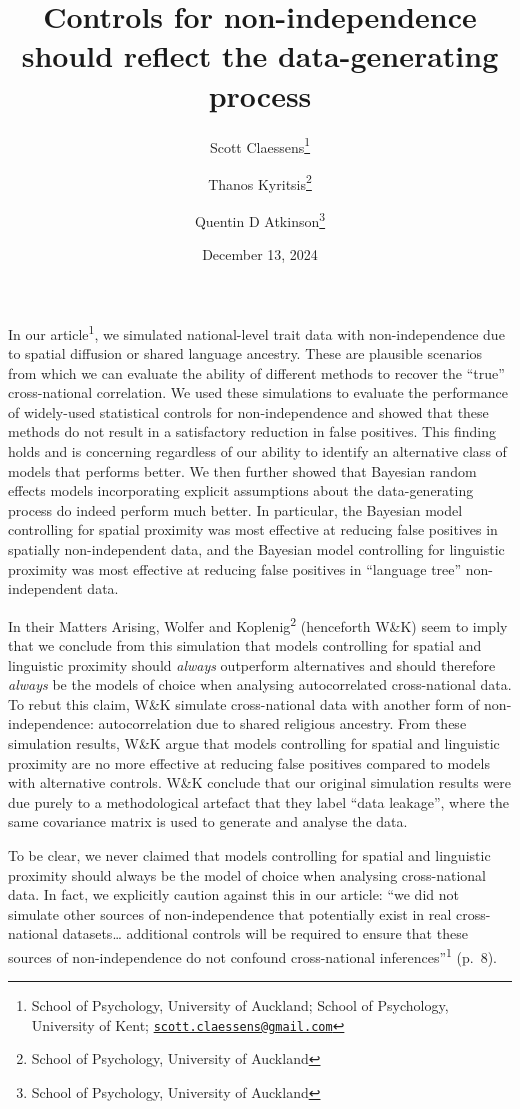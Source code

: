 \documentclass[
  11pt,
]{article}
\title{Controls for non-independence should reflect the data-generating process}
\author{Scott Claessens\footnote{School of Psychology, University of Auckland; School of Psychology, University of Kent; \href{mailto:scott.claessens@gmail.com}{\nolinkurl{scott.claessens@gmail.com}}} \and Thanos Kyritsis\footnote{School of Psychology, University of Auckland} \and Quentin D Atkinson\footnote{School of Psychology, University of Auckland}}
\date{December 13, 2024}
\begin{document}
\maketitle

\linenumbers

In our article\textsuperscript{1}, we simulated national-level trait data with
non-independence due to spatial diffusion or shared language ancestry. These are
plausible scenarios from which we can evaluate the ability of different methods
to recover the ``true'' cross-national correlation. We used these simulations to
evaluate the performance of widely-used statistical controls for
non-independence and showed that these methods do not result in a satisfactory
reduction in false positives. This finding holds and is concerning regardless of
our ability to identify an alternative class of models that performs better. We
then further showed that Bayesian random effects models incorporating explicit
assumptions about the data-generating process do indeed perform much better. In
particular, the Bayesian model controlling for spatial proximity was most
effective at reducing false positives in spatially non-independent data, and the
Bayesian model controlling for linguistic proximity was most effective at
reducing false positives in ``language tree'' non-independent data.

In their Matters Arising, Wolfer and Koplenig\textsuperscript{2} (henceforth W\&K) seem
to imply that we conclude from this simulation that models controlling for
spatial and linguistic proximity should \emph{always} outperform alternatives and
should therefore \emph{always} be the models of choice when analysing autocorrelated
cross-national data. To rebut this claim, W\&K simulate cross-national data with
another form of non-independence: autocorrelation due to shared religious
ancestry. From these simulation results, W\&K argue that models controlling for
spatial and linguistic proximity are no more effective at reducing false
positives compared to models with alternative controls. W\&K conclude that our
original simulation results were due purely to a methodological artefact that
they label ``data leakage'', where the same covariance matrix is used to generate
and analyse the data.

To be clear, we never claimed that models controlling for spatial and linguistic
proximity should always be the model of choice when analysing cross-national
data. In fact, we explicitly caution against this in our article: ``we did not
simulate other sources of non-independence that potentially exist in real
cross-national datasets\ldots{} additional controls will be required to ensure that
these sources of non-independence do not confound cross-national
inferences''\textsuperscript{1} (p.~8).
\end{document}

